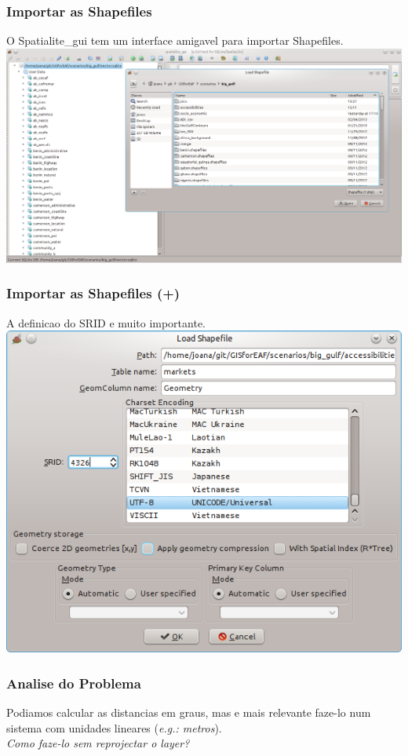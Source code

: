 \documentclass[hyperref={pdfpagelabels=true}]{beamer}
\begin{document}
\begin{frame}
\frametitle{Importar as Shapefiles}
O Spatialite\_gui tem um interface amigavel para importar Shapefiles.\\
\includegraphics[scale=0.3]{distance2.png}
\end{frame}

\begin{frame}
\frametitle{Importar as Shapefiles (+)}
A definicao do SRID e muito importante.\\
\includegraphics[scale=0.5]{distance3.png}
\end{frame}

\begin{frame}
\frametitle{Analise do Problema}
Podiamos calcular as distancias em graus, mas e mais relevante faze-lo num sistema com unidades lineares (\textit{e.g.: metros}).\\
\vspace{1cm}
\pause
\huge \textit{Como faze-lo sem reprojectar o layer?}
\end{frame}
\end{document}
